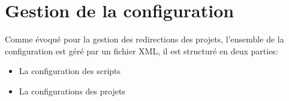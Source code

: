 \section*{Gestion de la configuration}

Comme évoqué pour la gestion des redirections des projets, l'ensemble de la configuration est géré par un fichier XML, il est structuré en deux parties:

\begin{itemize}
	\item{La configuration des scripts} 
	\item{La configurations des projets} 
\end{itemize}


